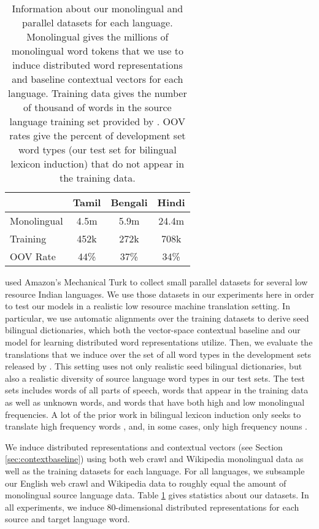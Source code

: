 \documentclass[11pt,letterpaper]{article}
\begin{document}
\begin{table}
\vspace{-.25cm}
\small
\begin{center}
\begin{tabular}{|l|c|c|c|}
\hline
{} & Tamil & Bengali & Hindi \\
\hline
Monolingual & 4.5m & 5.9m & 24.4m \\ %
Training & 452k & 272k & 708k \\
OOV Rate & 44\% & 37\% & 34\% \\
\hline
\end{tabular}
\end{center}
\caption{Information about our monolingual and parallel datasets for each language. Monolingual gives the millions of monolingual word tokens that we use to induce distributed word representations and baseline contextual vectors for each language. Training data gives the number of thousand of words in the source language training set provided by . OOV rates give the percent of development set word types (our test set for bilingual lexicon induction) that do not appear in the training data.}\label{datastats}
\vspace{-.35cm}
\end{table}


 used Amazon's Mechanical Turk to collect small parallel datasets for several low resource Indian languages. 
We use those datasets in our experiments here in order to test our models in a realistic low resource machine translation setting.
In particular, we use automatic alignments over the training datasets to derive seed bilingual dictionaries, which both the vector-space contextual baseline and our model for learning distributed word representations  utilize.
Then, we evaluate the translations that we induce over the set of all word types in the development sets released by .
This setting uses not only realistic seed bilingual dictionaries, but also a realistic diversity of source language word types in our test sets.
The test sets includes words of all parts of speech, words that appear in the training data as well as unknown words, and words that have both high and low monolingual frequencies.
A lot of the prior work in bilingual lexicon induction only seeks to translate high frequency words \cite{something}, and, in some cases, only high frequency nouns \cite{koehn02,haghighi08}.

We induce distributed representations and contextual vectors (see Section \ref{sec:contextbaseline}) using both web crawl and Wikipedia monolingual data as well as the training datasets for each language.
For all languages, we subsample our English web crawl and Wikipedia data to roughly equal the amount of monolingual source language data.
Table \ref{datastats} gives statistics about our datasets.
In all experiments, we induce 80-dimensional distributed representations for each source and target language word.
\end{document}
